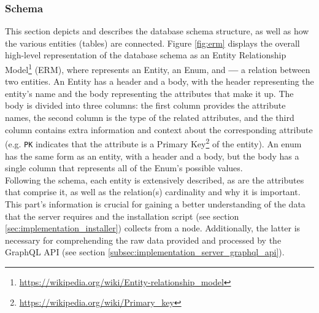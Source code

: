 \subsubsection{Schema}
\label{subsubsec:implementation_server_database_schema}

This section depicts and describes the database schema structure, as well as how
the various entities (tables) are connected. Figure \ref{fig:erm} displays the overall
high-level representation of the database schema as an Entity Relationship Model\footnote{\url{https://wikipedia.org/wiki/Entity-relationship_model}}
(ERM), where 
represents an Entity, 
an Enum, and \textbf{---} a relation between two entities. An Entity has a
header and a body, with the header representing the entity's name and the body representing
the attributes that make it up. The body is divided into three columns: the first
column provides the attribute names, the second column is the type of the
related attributes, and the third column contains extra information and context about
the corresponding attribute (e.g. \texttt{PK} indicates that the attribute is a
Primary Key\footnote{\url{https://wikipedia.org/wiki/Primary_key}} of the entity).
An enum has the same form as an entity, with a header and a body, but the body
has a single column that represents all of the Enum's possible values. \\ %
Following the schema, each entity is extensively described, as are the
attributes that comprise it, as well as the relation(s) cardinality and why it
is important. \\ %
This part's information is crucial for gaining a better understanding of the
data that the server requires and the installation script (see section \ref{sec:implementation_installer})
collects from a node. Additionally, the latter is necessary for comprehending
the raw data provided and processed by the GraphQL API (see section \ref{subsec:implementation_server_graphql_api}).

\clearpage
\newpage


